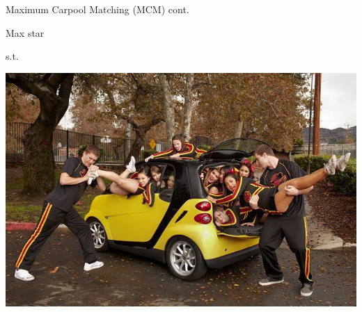 \begin{frame}{Maximum Carpool Matching (MCM) cont.}
\begin{center}
\Huge
Max \3star

s.t. 

\includegraphics[scale=.3]{capacity}

\end{center}
\end{frame}